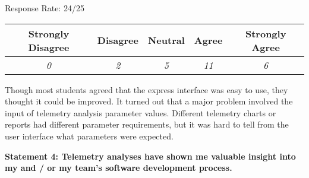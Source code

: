 \begin{center}Response Rate: 24/25\end{center}
\begin{table}[h]
	\centering
		\begin{tabular}{|c|c|c|c|c|} 
			\hline
			\textbf{Strongly Disagree} & \textbf{Disagree} & \textbf{Neutral} & \textbf{Agree} & \textbf{Strongly Agree} \\
			\hline
			\textit{0} & \textit{2} & \textit{5} & \textit{11} &\textit{6} \\
			\hline
		\end{tabular}
	\label{table:InClassSurvey-Q3}
\end{table}

%

Though most students agreed that the express interface was easy to use, they thought it could be improved. It turned out that a major problem involved the input of telemetry analysis parameter values. Different telemetry charts or reports had different parameter requirements, but it was hard to tell from the user interface what parameters were expected.





\newpage
\textbf{Statement 4: Telemetry analyses have shown me valuable insight into my and / or my team's software development process.}

